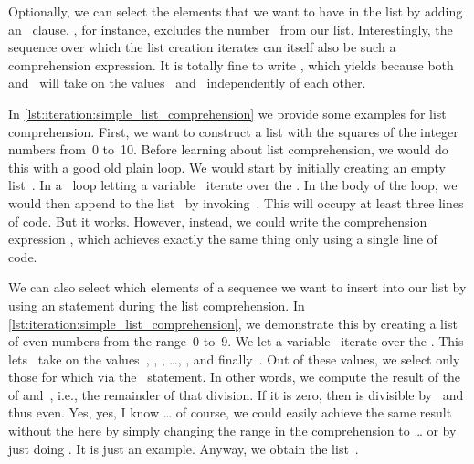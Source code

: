 Optionally, we can select the elements that we want to have in the list by adding an ~clause.
\pythonil{[i for i in range(10) if i != 3]}, for instance, excludes the number~ from our list.
Interestingly, the sequence over which the list creation iterates can itself also be such a comprehension expression.
It is totally fine to write , which yields \pythonil{[0, 0, 0, 1]} because both~ and~ will take on the values~ and~ independently of each other.

In \cref{lst:iteration:simple_list_comprehension} we provide some examples for list comprehension.
First, we want to construct a list with the squares of the integer numbers from~0 to~10.
Before learning about list comprehension, we would do this with a good old plain  loop.
We would start by initially creating an empty list~.
In a ~loop letting a variable~ iterate over the .
In the body of the loop, we would then append  to the list~ by invoking~.
This will occupy at least three lines of code.
But it works.
However, instead, we could write the comprehension expression , which achieves exactly the same thing only using a single line of code.

We can also select which elements of a sequence we want to insert into our list by using an  statement during the list comprehension.
In \cref{lst:iteration:simple_list_comprehension}, we demonstrate this by creating a list of even numbers from the range~0 to~9.
We let a variable~ iterate over the .
This lets~ take on the values~, , , \dots, , and finally~.
Out of these values, we select only those for which  via the ~statement.
In other words, we compute the result of the  of  and~, i.e., the remainder of that division.
If it is zero, then  is divisible by~ and thus even.
Yes, yes, I know {\dots} of course, we could easily achieve the same result without the  here by simply changing the range in the comprehension to  {\dots} or by just doing .
It is just an example.
Anyway, we obtain the list~\pythonil{[0, 2, 4, 6, 8]}.

